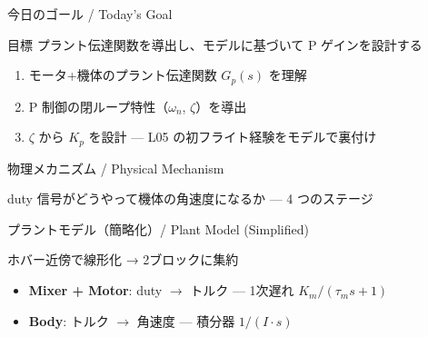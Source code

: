 \documentclass[aspectratio=169, 14pt]{beamer}
\begin{document}
\begin{frame}
  \titlepage
\end{frame}

\begin{frame}{今日のゴール / Today's Goal}
  \begin{block}{目標}
    プラント伝達関数を導出し、モデルに基づいて P ゲインを設計する
  \end{block}

  \vspace{1em}

  \begin{enumerate}
    \item モータ+機体のプラント伝達関数 $G_p(s)$ を理解
    \item P 制御の閉ループ特性（$\omega_n$, $\zeta$）を導出
    \item $\zeta$ から $K_p$ を設計 --- L05 の初フライト経験をモデルで裏付け
  \end{enumerate}
\end{frame}

\begin{frame}{物理メカニズム / Physical Mechanism}
  \begin{center}
    \vspace{-2mm}
    \resizebox{0.95\textwidth}{!}{}
  \end{center}

  \vspace{-0.5em}

  {\small duty 信号がどうやって機体の角速度になるか --- 4 つのステージ}
\end{frame}

\begin{frame}{プラントモデル（簡略化）/ Plant Model (Simplified)}
  \begin{center}
    \vspace{-2mm}
    \resizebox{0.85\textwidth}{!}{}
  \end{center}

  \vspace{-0.5em}

  \begin{exampleblock}{ホバー近傍で線形化 → 2ブロックに集約}
    \begin{itemize}
      \item \textbf{Mixer + Motor}: duty $\to$ トルク
            --- 1次遅れ $K_m/(\tau_m s + 1)$
      \item \textbf{Body}: トルク $\to$ 角速度
            --- 積分器 $1/(I \cdot s)$
    \end{itemize}
  \end{exampleblock}
\end{frame}
\end{document}
